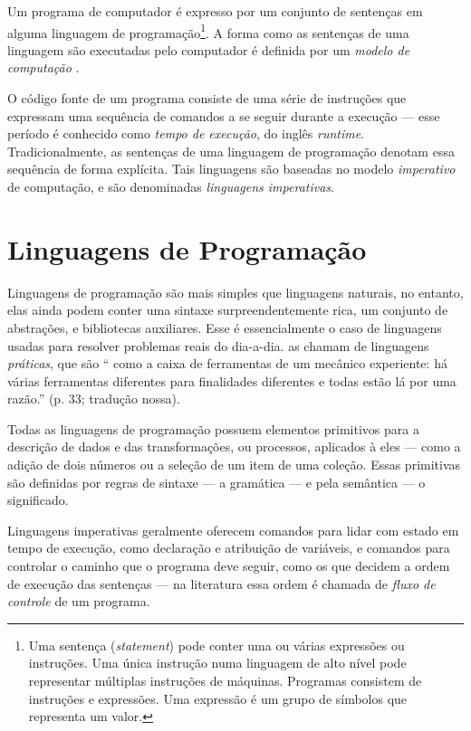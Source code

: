 Um programa de computador é expresso por um conjunto de sentenças em alguma
linguagem de programação\footnote{Uma sentença (\emph{statement}) pode conter uma ou várias expressões ou instruções.
Uma única instrução numa linguagem de alto nível pode representar múltiplas
instruções de máquinas.
Programas consistem de instruções e expressões.
Uma expressão é um grupo de símbolos que representa um valor.}.
A forma como as sentenças de uma linguagem são executadas pelo computador é
definida por um \emph{modelo de computação} \cite{roy2004}.

O código fonte de um programa consiste de uma série de instruções que expressam
uma sequência de comandos a se seguir durante a execução — esse período é
conhecido como \emph{tempo de execução}, do inglês \emph{runtime}.
Tradicionalmente, as sentenças de uma linguagem de programação denotam essa
sequência de forma explícita.
Tais linguagens são baseadas no modelo \emph{imperativo} de computação, e são
denominadas \emph{linguagens imperativas}.

\section{Linguagens de Programação}
\label{sec:org15634a5}
\label{sec:langs}

Linguagens de programação são mais simples que linguagens naturais, no
entanto, elas ainda podem conter uma sintaxe surpreendentemente rica, um
conjunto de abstrações, e bibliotecas auxiliares.
Esse é essencialmente o caso de linguagens usadas para resolver problemas
reais do dia-a-dia.
\textcite{roy2004} as chamam de linguagens \emph{práticas}, que são “\textelp{}
como a caixa de ferramentas de um mecânico experiente: há várias ferramentas
diferentes para finalidades diferentes e todas estão lá por uma razão.” (p.
33; tradução nossa).

Todas as linguagens de programação possuem elementos primitivos para a
descrição de dados e das transformações, ou processos, aplicados à eles —
como a adição de dois números ou a seleção de um item de uma coleção.
Essas primitivas são definidas por regras de sintaxe — a gramática — e pela
semântica — o significado.

Linguagens imperativas geralmente oferecem comandos para lidar com estado em
tempo de execução, como declaração e atribuição de variáveis, e comandos
para controlar o caminho que o programa deve seguir, como os que decidem a
ordem de execução das sentenças — na literatura essa ordem é chamada de
\emph{fluxo de controle} de um programa.

